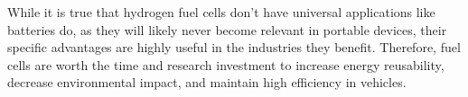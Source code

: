 \documentclass[stu]{apa7}
\begin{document}
    
    While it is true that hydrogen fuel cells don't have universal applications like batteries do,
    as they will likely never become relevant in portable devices, their specific advantages
    are highly useful in the industries they benefit.  Therefore, fuel cells are worth the time
    and research investment to increase energy reusability, decrease environmental impact, and
    maintain high efficiency in vehicles.
    
    
    \printbibliography
\end{document}
